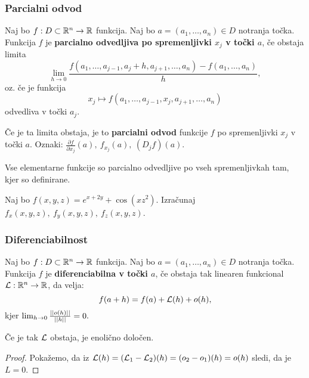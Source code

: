 \subsubsection{Parcialni odvod}
\begin{definicija}
    Naj bo $f: D \subset \mathbb{R}^n \to \mathbb{R}$ funkcija. Naj bo $a = (a_1, \ldots, a_n) \in D$ notranja točka. Funkcija $f$ je \textbf{parcialno odvedljiva po spremenljivki $x_j$ v točki $a$}, če obstaja limita 
    $$\lim_{h \to 0} \frac{f(a_1, \ldots, a_{j-1}, a_j+h, a_{j+1}, \ldots, a_n) - f(a_1, \ldots, a_n)}{h},$$
    oz. če je funkcija 
    $$x_j \mapsto f(a_1, \ldots, a_{j-1}, x_j, a_{j+1}, \ldots, a_n)$$
    odvedliva v točki $a_j$.

    Če je ta limita obstaja, je to \textbf{parcialni odvod} funkcije $f$ po spremenljivki $x_j$ v točki $a$.
    Oznaki: $\frac{\partial f}{\partial x_j}(a), \ f_{x_j}(a), \ (D_jf)(a)$.
\end{definicija}

\begin{opomba}
    Vse elementarne funkcije so parcialno odvedljive po vseh spremenljivkah tam, kjer so definirane.
\end{opomba}

\begin{zgled}
    Naj bo $f(x, y, z) = e^{x+2y} + \cos(xz^2)$. Izračunaj $f_x(x,y,z), \ f_y(x,y,z), \ f_z(x,y,z)$.
\end{zgled}

\subsubsection{Diferenciabilnost}
\begin{definicija}
    Naj bo $f: D \subset \mathbb{R}^n \to \mathbb{R}$ funkcija. Naj bo $a = (a_1, \ldots, a_n) \in D$ notranja točka. Funkcija $f$ je \textbf{diferenciabilna v točki $a$}, če obstaja tak linearen funkcional $\mathcal{L}: \mathbb{R}^n \to \mathbb{R}$, da velja:
    $$f(a+h) = f(a) + \mathcal{L}(h) + o(h),$$
    kjer $\lim_{h \to 0} \frac{||o(h)||}{||h||} = 0.$
\end{definicija}

\begin{opomba}
    Če je tak $\mathcal{L}$ obstaja, je enolično določen.
\end{opomba}

\begin{proof}
    Pokažemo, da iz $\mathcal{L}(h) = (\mathcal{L}_1 - \mathcal{L}_2)(h) = (o_2 - o_1)(h) = o(h)$ sledi, da je $L = 0$.
\end{proof}


